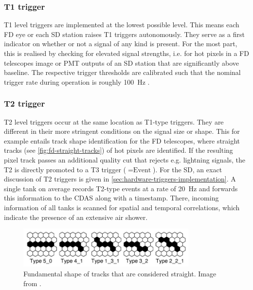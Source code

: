 \subsubsection{T1 trigger}
\label{sssec:t1-trigger}

T1 level triggers are implemented at the lowest possible level. This means each FD eye or each SD station raises T1 triggers autonomously. They serve as a first 
indicator on whether or not a signal of any kind is present. For the most part, this is realised by checking for elevated signal strengths, i.e. for hot pixels 
in a FD telescopes image or PMT outputs of an SD station that are significantly above baseline. The respective trigger thresholds are calibrated such that the 
nominal trigger rate during operation is roughly \SI{100}{\hertz} \cite{FDReconstruction, SDReconstruction}. 

\subsubsection{T2 trigger}
\label{sssec:t2-trigger}

T2 level triggers occur at the same location as T1-type triggers. They are different in their more stringent conditions on the signal size or shape. This for 
example entails track shape identification for the FD telescopes, where straight tracks (see \autoref{fig:fd-straight-tracks}) of hot pixels are identified. 
If the resulting pixel track passes an additional quality cut that rejects e.g. lightning signals, the T2 is directly promoted to a T3 trigger ($=\text{Event}$). 
For the SD, an exact discussion of T2 triggers is given in \autoref{sec:hardware-triggers-implementation}. A single tank on average records T2-type events at a 
rate of \SI{20}{\hertz} and forwards this information to the CDAS along with a timestamp. There, incoming information of all tanks is scanned for spatial and 
temporal correlations, which indicate the presence of an extensive air shower. 

\begin{figure}
	\centering
	\includegraphics[width=0.8\textwidth]{./imgs/FD_straight_tracks.png}
	\caption{Fundamental shape of tracks that are considered straight. Image from \cite{FDReconstruction}.}
	\label{fig:fd-straight-tracks}
\end{figure}

